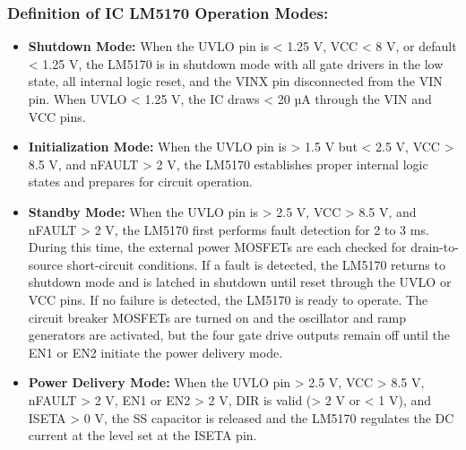 \subsubsection{Definition of IC LM5170 Operation Modes:}
\begin{itemize}
    \item \textbf{Shutdown Mode:} When the UVLO pin is < 1.25 V, VCC < 8 V, or default < 1.25 V, the LM5170 is in
    shutdown mode with all gate drivers in the low state, all internal logic reset, and the VINX pin disconnected
    from the VIN pin. When UVLO < 1.25 V, the IC draws < 20 µA through the VIN and VCC pins\cite{TI_LM5170_User_Datasheet}.
    \item \textbf{Initialization Mode:}  When the UVLO pin is > 1.5 V but < 2.5 V, VCC > 8.5 V, and nFAULT > 2 V, the LM5170
    establishes proper internal logic states and prepares for circuit operation\cite{TI_LM5170_User_Datasheet}.
    \item \textbf{Standby Mode:}  When the UVLO pin is > 2.5 V, VCC > 8.5 V, and nFAULT > 2 V, the LM5170 first
    performs fault detection for 2 to 3 ms. During this time, the external power MOSFETs are each checked for
    drain-to-source short-circuit conditions. If a fault is detected, the LM5170 returns to shutdown mode and is
    latched in shutdown until reset through the UVLO or VCC pins. If no failure is detected, the LM5170 is ready
    to operate. The circuit breaker MOSFETs are turned on and the oscillator and ramp generators are activated,
    but the four gate drive outputs remain off until the EN1 or EN2 initiate the power delivery mode\cite{TI_LM5170_User_Datasheet}.
    \item \textbf{Power Delivery Mode:}  When the UVLO pin > 2.5 V, VCC > 8.5 V, nFAULT > 2 V, EN1 or EN2 > 2 V, DIR
    is valid (> 2 V or < 1 V), and ISETA > 0 V, the SS capacitor is released and the LM5170 regulates the DC
    current at the level set at the ISETA pin\cite{TI_LM5170_User_Datasheet}.
\end{itemize}

